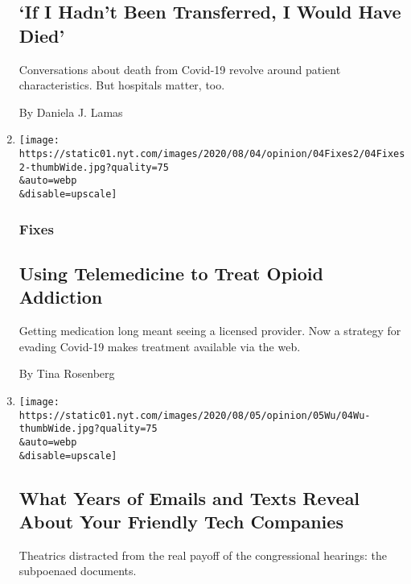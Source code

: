 \begin{enumerate}
  \hypertarget{if-i-hadnt-been-transferred-i-would-have-died}{%
  \subsection{`If I Hadn't Been Transferred, I Would Have
  Died'}\label{if-i-hadnt-been-transferred-i-would-have-died}}

  Conversations about death from Covid-19 revolve around patient
  characteristics. But hospitals matter, too.

  By Daniela J. Lamas
\item
  \href{/2020/08/04/opinion/opioid-telemedicine-covid.html}{}

  \texttt{[image: https://static01.nyt.com/images/2020/08/04/opinion/04Fixes2/04Fixes2-thumbWide.jpg?quality=75\\\&auto=webp\\\&disable=upscale]}

  \hypertarget{fixes}{%
  \subsubsection{Fixes}\label{fixes}}

  \hypertarget{using-telemedicine-to-treat-opioid-addiction}{%
  \subsection{Using Telemedicine to Treat Opioid
  Addiction}\label{using-telemedicine-to-treat-opioid-addiction}}

  Getting medication long meant seeing a licensed provider. Now a
  strategy for evading Covid-19 makes treatment available via the web.

  By Tina Rosenberg
\item
  \href{/2020/08/04/opinion/amazon-facebook-congressional-hearings.html}{}

  \texttt{[image: https://static01.nyt.com/images/2020/08/05/opinion/05Wu/04Wu-thumbWide.jpg?quality=75\\\&auto=webp\\\&disable=upscale]}

  \hypertarget{what-years-of-emails-and-texts-reveal-about-your-friendly-tech-companies}{%
  \subsection{What Years of Emails and Texts Reveal About Your Friendly
  Tech
  Companies}\label{what-years-of-emails-and-texts-reveal-about-your-friendly-tech-companies}}

  Theatrics distracted from the real payoff of the congressional
  hearings: the subpoenaed documents.


\end{enumerate}
